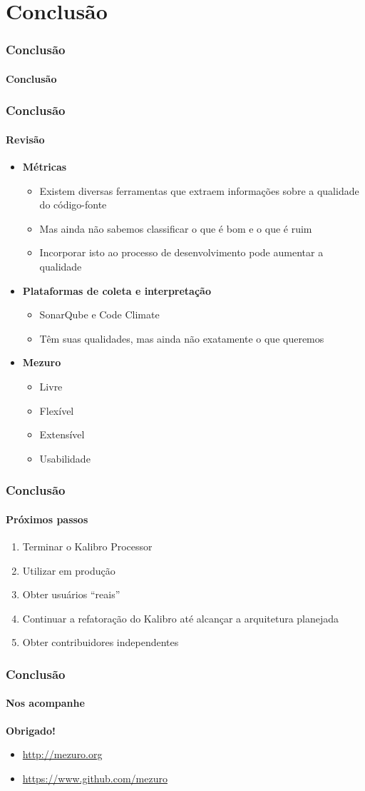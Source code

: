 \documentclass{beamer}
\begin{document}
\section{Conclusão}
\begin{frame}
  \frametitle{Conclusão}
  \framesubtitle{}

  \LARGE{\textbf{Conclusão}}
\end{frame}

\begin{frame}
  \frametitle{Conclusão}
  \framesubtitle{Revisão}

  \begin{itemize}
    \item \textbf{Métricas}
      \begin{itemize}
        \item Existem diversas ferramentas que extraem informações sobre a qualidade do código-fonte
        \item Mas ainda não sabemos classificar o que é bom e o que é ruim
        \item Incorporar isto ao processo de desenvolvimento pode aumentar a qualidade
      \end{itemize}
    \item \textbf{Plataformas de coleta e interpretação}
      \begin{itemize}
        \item SonarQube e Code Climate
        \item Têm suas qualidades, mas ainda não exatamente o que queremos
      \end{itemize}
    \item \textbf{Mezuro}
      \begin{itemize}
        \item Livre
        \item Flexível
        \item Extensível
        \item Usabilidade
      \end{itemize}
  \end{itemize}
\end{frame}

\begin{frame}
  \frametitle{Conclusão}
  \framesubtitle{Próximos passos}

  \begin{enumerate}
    \item Terminar o Kalibro Processor
    \item Utilizar em produção
    \item Obter usuários ``reais''
    \item Continuar a refatoração do Kalibro até alcançar a arquitetura planejada
    \item Obter contribuidores independentes
  \end{enumerate}
\end{frame}

\begin{frame}
  \frametitle{Conclusão}
  \framesubtitle{Nos acompanhe}

  \LARGE{\textbf{Obrigado!}}

  \begin{itemize}
    \item \url{http://mezuro.org}
    \item \url{https://www.github.com/mezuro}
  \end{itemize}
\end{frame}
\end{document}
